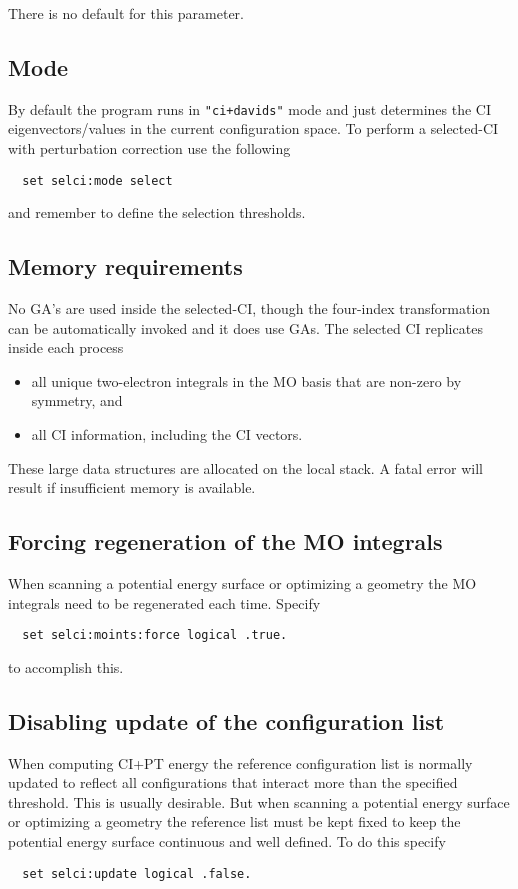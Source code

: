 There is no default for this parameter.


\subsection{Mode}

By default the program runs in \verb="ci+davids"= mode and just
determines the CI eigenvectors/values in the current configuration
space.  To perform a selected-CI with perturbation correction use the
following
\begin{verbatim}
  set selci:mode select
\end{verbatim}
and remember to define the selection thresholds.

\subsection{Memory requirements}

No GA's are used inside the selected-CI, though the four-index
transformation can be automatically invoked and it does use GAs.  The
selected CI replicates inside each process
\begin{itemize}
\item all unique two-electron integrals in the MO basis that are
  non-zero by symmetry, and
\item all CI information, including the CI vectors.
\end{itemize}
These large data structures are allocated on the local stack.  A fatal
error will result if insufficient memory is available.


\subsection{Forcing regeneration of the MO integrals}

When scanning a potential energy surface or optimizing a geometry the
MO integrals need to be regenerated each time.  Specify
\begin{verbatim}
  set selci:moints:force logical .true.
\end{verbatim}
to accomplish this.

\subsection{Disabling update of the configuration list}

When computing CI+PT energy the reference configuration list is
normally updated to reflect all configurations that interact more than
the specified threshold.  This is usually desirable.  But
when scanning a potential energy surface or optimizing a geometry the
reference list must be kept fixed to keep the potential energy surface
continuous and well defined.  To do this specify
\begin{verbatim}
  set selci:update logical .false.
\end{verbatim}


